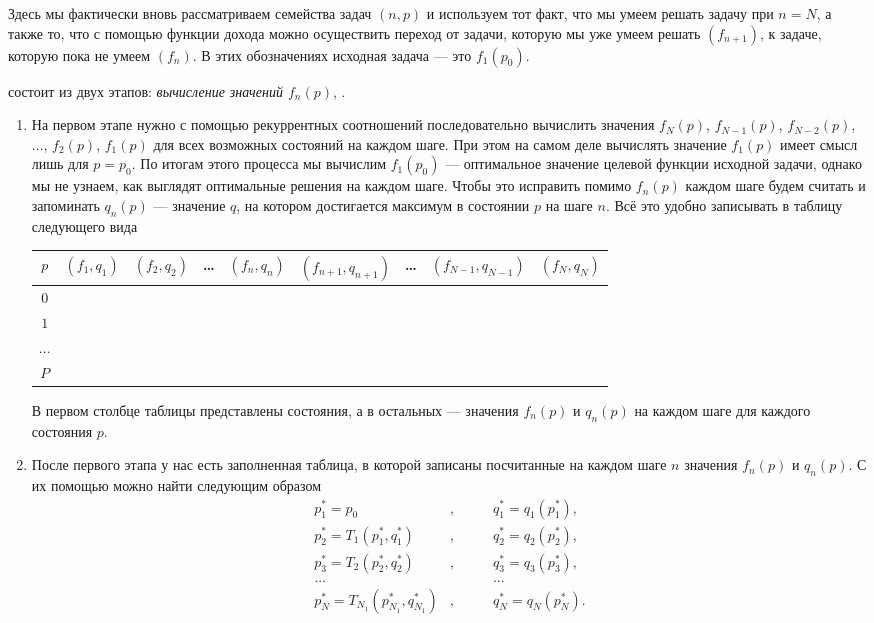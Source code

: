 Здесь мы фактически вновь рассматриваем семейства задач $(n, p)$ и используем тот факт, что мы умеем решать задачу при $n = N$, а также то, что с помощью функции дохода можно осуществить переход от задачи, которую мы уже умеем решать $(f_{n+1})$, к задаче, которую пока не умеем $(f_n)$. В этих обозначениях исходная задача --- это $f_1(p_0)$.

\underline{} состоит из двух этапов: \textit{вычисление значений $f_n(p)$}, .

\begin{enumerate}[nosep]
	\item[\fbox{Этап 1}] На первом этапе нужно с помощью рекуррентных соотношений последовательно вычислить значения $f_N(p)$, $f_{N-1}(p)$, $f_{N-2}(p)$, $\dots$, $f_2(p)$, $f_1(p)$ для всех возможных состояний на каждом шаге. При этом на самом деле вычислять значение $f_1(p)$ имеет смысл лишь для $p = p_0$. По итогам этого процесса мы вычислим $f_1(p_0)$ --- оптимальное значение целевой функции исходной задачи, однако мы не узнаем, как выглядят оптимальные решения на каждом шаге. Чтобы это исправить помимо $f_n(p)$ каждом шаге будем считать и запоминать $q_n(p)$ --- значение $q$, на котором достигается максимум в состоянии $p$ на шаге $n$. Всё это удобно записывать в таблицу следующего вида
	
	\begin{table}[H]
		\centering
		\begin{tabular}{ | c | c | c | c | c | c | c | c | c | } 
			\hline
			$p$ & $(f_1, q_1)$ & $(f_2, q_2)$ & \dots & $(f_n, q_n)$ & $(f_{n+1}, q_{n+1})$ & \dots & $(f_{N-1}, q_{N-1})$ & $(f_N, q_N)$ \\ 
			\hline
			$0$ & & & & & & & & \\\hline
			$1$ & & & & & & & & \\\hline
			$\dots$ & & & & & & & & \\\hline
			$P$ & & & & & & & & \\\hline
		\end{tabular}
	\end{table}
	
	В первом столбце таблицы представлены состояния, а в остальных --- значения $f_n(p)$ и $q_n(p)$ на каждом шаге для каждого состояния $p$.
	
	\item[\fbox{Этап 2}] После первого этапа у нас есть заполненная таблица, в которой записаны посчитанные на каждом шаге $n$ значения $f_n(p)$ и $q_n(p)$. С их помощью можно найти \underline{} следующим образом
	\begin{align*}
		p_1^* = p_0&, \qquad &q_1^* = q_1(p_1^*), \\
		p_2^* = T_1(p_1^*, q_1^*)&, &q_2^* = q_2(p_2^*), \\
		p_3^* = T_2(p_2^*, q_2^*)&, &q_3^* = q_3(p_3^*), \\
		\dots& &\dots \\
		p_N^* = T_{N_1}(p_{N_1}^*, q_{N_1}^*)&, &q_N^* = q_N(p_N^*).
	\end{align*}
\end{enumerate}

